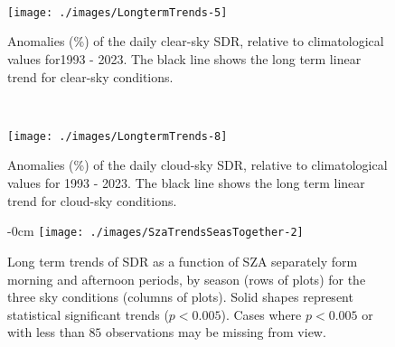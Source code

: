 \appendix
\section{}


\  \


\begin{figure}[h!]
{\centering \texttt{[image: ./images/LongtermTrends-5]}

}
\caption{Anomalies (\%) of the daily clear-sky SDR, relative to climatological values for1993 - 2023. The black line shows the long term linear trend for clear-sky conditions.}\label{fig:trendCLEAR}
\end{figure}

\  \

\begin{figure}[h!]
{\centering \texttt{[image: ./images/LongtermTrends-8]}

}
\caption{Anomalies (\%) of the daily cloud-sky SDR, relative to climatological values for 1993 - 2023. The black line shows the long term linear trend for cloud-sky conditions.}\label{fig:trendCLOUD}
\end{figure}


\begin{figure}[h!]
    \begin{adjustwidth}{-\extralength}{0cm}
        \centering
        \texttt{[image: ./images/SzaTrendsSeasTogether-2]}
        \caption{Long term trends of SDR as a function of SZA separately form morning
               and afternoon periods, by season (rows of plots) for the three sky
               conditions (columns of plots).
               Solid shapes represent statistical significant trends ($p<0.005$).
               Cases where $p<0.005$ or with less than $85$ observations may be
               missing from view.}\label{fig:SZAtrendSeason}
    \end{adjustwidth}
\end{figure}


